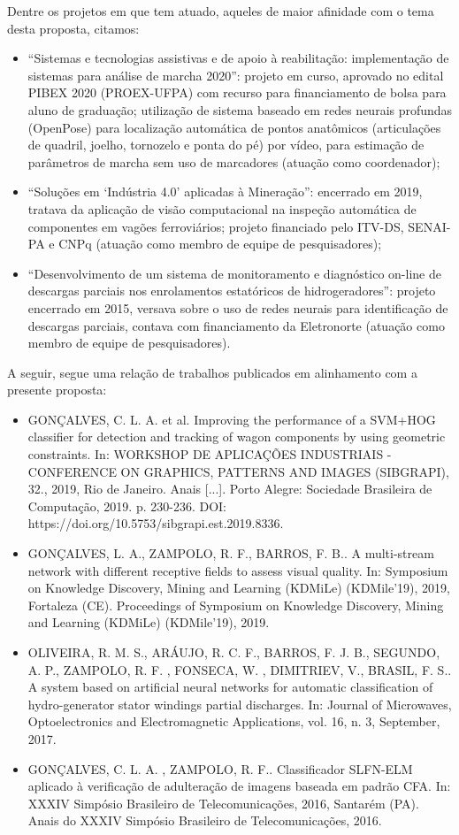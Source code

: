 \begin{enumerate}
Dentre os projetos em que tem atuado, aqueles de maior afinidade com o tema desta proposta, citamos: 
		\begin{itemize}
			\item ``Sistemas e tecnologias assistivas e de apoio à reabilitação: implementação de sistemas para análise de marcha 2020'': projeto em curso, aprovado no edital PIBEX 2020 (PROEX-UFPA) com recurso para financiamento de bolsa para aluno de graduação; utilização de sistema baseado em redes neurais profundas (OpenPose)\parencite{cao-2019} para localização automática de pontos anatômicos (articulações de quadril, joelho, tornozelo e ponta do pé) por vídeo, para estimação de parâmetros de marcha sem uso de marcadores (atuação como coordenador); 
			\item ``Soluções em `Indústria 4.0' aplicadas à Mineração'': encerrado em 2019, tratava da aplicação de visão computacional na inspeção automática de componentes em vagões ferroviários; projeto financiado pelo ITV-DS, SENAI-PA e CNPq (atuação como membro de equipe de pesquisadores);
			\item ``Desenvolvimento de um sistema de monitoramento e diagnóstico on-line de descargas parciais nos enrolamentos estatóricos de hidrogeradores'': projeto encerrado em 2015, versava sobre o uso de redes neurais para identificação de descargas parciais, contava com financiamento da Eletronorte (atuação como membro de equipe de pesquisadores).
		\end{itemize}
A seguir, segue uma relação de trabalhos publicados em alinhamento com a presente  proposta:
		\begin{itemize}
			\item GONÇALVES, C. L. A. et al. Improving the performance of a SVM+HOG classifier for detection and tracking of wagon components by using geometric constraints. In: WORKSHOP DE APLICAÇÕES INDUSTRIAIS - CONFERENCE ON GRAPHICS, PATTERNS AND IMAGES (SIBGRAPI), 32., 2019, Rio de Janeiro. Anais [...]. Porto Alegre: Sociedade Brasileira de Computação, 2019. p. 230-236. DOI: https://doi.org/10.5753/sibgrapi.est.2019.8336. 
			\item GONÇALVES, L. A., ZAMPOLO, R. F., BARROS, F. B.. A multi-stream network with different receptive fields to assess visual quality. In: Symposium on Knowledge Discovery, Mining and Learning (KDMiLe) (KDMile'19), 2019, Fortaleza (CE). Proceedings of Symposium on Knowledge Discovery, Mining and Learning (KDMiLe) (KDMile'19), 2019. 
			\item OLIVEIRA, R. M. S., ARÁUJO, R. C. F., BARROS, F. J. B., SEGUNDO, A. P., ZAMPOLO, R. F. , FONSECA, W. , DIMITRIEV, V., BRASIL, F. S.. A system based on artificial neural networks for automatic classification of hydro-generator stator windings partial discharges. In: Journal of Microwaves, Optoelectronics and Electromagnetic Applications, vol. 16, n. 3, September, 2017.
			\item GONÇALVES, C. L. A. , ZAMPOLO, R. F.. Classificador SLFN-ELM aplicado à verificação de adulteração de imagens baseada em padrão CFA. In: XXXIV Simpósio Brasileiro de Telecomunicações, 2016, Santarém (PA). Anais do XXXIV Simpósio Brasileiro de Telecomunicações, 2016.
		\end{itemize}	


\end{enumerate}

